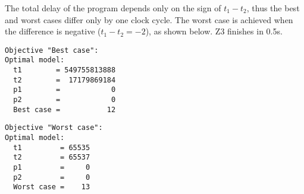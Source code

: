 \noindent
The total delay of the program depends only on the sign of $t_1 - t_2$, thus
the best and worst cases differ only by one clock cycle. The worst case is
achieved when the difference is negative ($t_1 - t_2 = -2$), as shown below.
Z3 finishes in 0.5s.

\vspace{2mm}
\noindent
\begin{minipage}{0.53\linewidth}
\begin{verbatim}
Objective "Best case":
Optimal model:
  t1        = 549755813888
  t2        =  17179869184
  p1        =            0
  p2        =            0
  Best case =           12
\end{verbatim}
\end{minipage}
\begin{minipage}{0.46\linewidth}
\begin{verbatim}
Objective "Worst case":
Optimal model:
  t1         = 65535
  t2         = 65537
  p1         =     0
  p2         =     0
  Worst case =    13
\end{verbatim}
\end{minipage}

